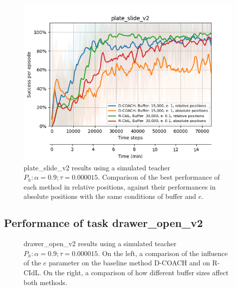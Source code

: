 \begin{figure}[H]
    \centering
    \includegraphics[width=.7\textwidth]{figures/hockey_best_v2.png}
    \caption{plate\_slide\_v2 results using a simulated teacher $P_h: \alpha = 0.9; \tau =  0.000015$. Comparison of the best performance of each method in relative positions, against their performances in absolute positions with the same conditions of buffer and $e$.}
    
    
    \label{fig:results_plate_slide_best}
\end{figure}

\subsection{Performance of task drawer\_open\_v2}
\label{subsection:Performance of task drawer_open_v2}


 \begin{figure}[H]
  \centering
   \hfill

  \caption{drawer\_open\_v2 results using a simulated teacher $P_h: \alpha = 0.9; \tau =  0.000015$. On the left, a comparison of the influence of the $e$ parameter on the baseline method D-COACH and on R-CIdL. On the right, a comparison of how different buffer sizes affect both methods.}
  \label{fig:results_drawer_open_buffer_e}
\end{figure}

